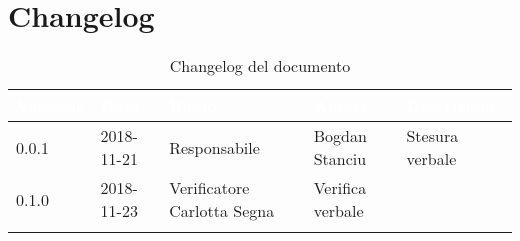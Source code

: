 \newpage

\section{Changelog}

\begin{center}
\begin{longtable}[c]{|m{}|m{}|m{}|m{}|p{}|}
\hline
\rowcolor{bluelogo}\textbf{\textcolor{white}{Versione}} & \textbf{\textcolor{white}{Data}} & \textbf{\textcolor{white}{Ruolo}} & \textbf{\textcolor{white}{Autore}} & \textbf{\textcolor{white}{Descrizione}}\\
\hline \hline
\endfirsthead
0.0.1 & 2018-11-21 & Responsabile &  Bogdan Stanciu & Stesura verbale \\
\hline
\rowcolor{grigio} 0.1.0 & 2018-11-23 & Verificatore Carlotta Segna & Verifica verbale\\
\hline
\caption{Changelog del documento}
\end{longtable}
\end{center}
